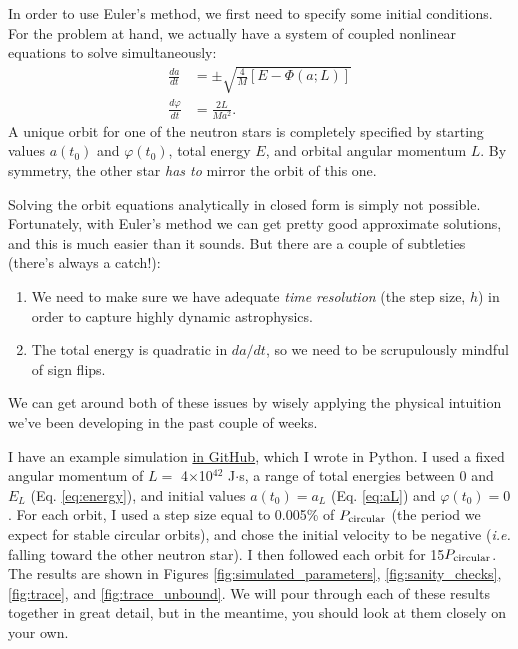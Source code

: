 \documentclass[11pt]{article}
\begin{document}
\begin{enumerate}
\hspace{15pt} In order to use Euler's method, we first need to specify some initial conditions. For the problem at hand, we actually have a system of coupled nonlinear equations to solve simultaneously:
\begin{align*}
\frac{da}{dt} &= \pm \sqrt{ \frac{4}{M} \left[ E - \Phi(a; L) \right] } \\
\frac{d\varphi}{dt} &= \frac{2L}{Ma^2}.
\end{align*}
A unique orbit for one of the neutron stars is completely specified by starting values $a(t_0)$ and $\varphi(t_0)$, total energy $E$, and orbital angular momentum $L$. By symmetry, the other star \emph{has to} mirror the orbit of this one.

\hspace{2pt} Solving the orbit equations analytically in closed form is simply not possible. Fortunately, with Euler's method we can get pretty good approximate solutions, and this is much easier than it sounds. But there are a couple of subtleties (there's always a catch!):
\begin{enumerate}
\item We need to make sure we have adequate \textit{time resolution} (the step size, $h$) in order to capture highly dynamic astrophysics.

\item The total energy is quadratic in $da/dt$, so we need to be scrupulously mindful of sign flips.
\end{enumerate}
We can get around both of these issues by wisely applying the physical intuition we've been developing in the past couple of weeks.

\hspace{15pt}I have an example simulation \href{https://github.com/alurban/mentoring/blob/master/tidal_distortion/scripts/kepler_orbits.py}{in GitHub}, which I wrote in Python. I used a fixed angular momentum of $L=$ 4$\times$10$^{42}$ J$\cdot$s, a range of total energies between 0 and $E_L$ (Eq. \ref{eq:energy}), and initial values $a(t_0) = a_L$ (Eq. \ref{eq:aL}) and $\varphi(t_0) = 0$. For each orbit, I used a step size equal to 0.005\% of $P_{\rm circular}$ (the period we expect for stable circular orbits), and chose the initial velocity to be negative (\textit{i.e.} falling toward the other neutron star). I then followed each orbit for 15$P_{\rm circular}$. The results are shown in Figures \ref{fig:simulated_parameters}, \ref{fig:sanity_checks}, \ref{fig:trace}, and \ref{fig:trace_unbound}. We will pour through each of these results together in great detail, but in the meantime, you should look at them closely on your own.

\end{enumerate}
\end{document}
